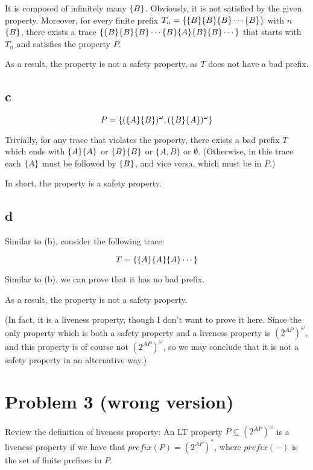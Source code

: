 It is composed of infinitely many $\{B\}$. Obviously, it is not satisfied by the given property.
Moreover, for every finite prefix $T_n = \{\{B\} \{B\} \{B\} \cdots \{B\}\}$ with $n$ $\{B\}$,
there exists a trace $\{\{B\} \{B\} \{B\} \cdots \{B\} \{A\} \{B\} \{B\} \cdots\}$
that starts with $T_n$ and satisfies the property $P$.

As a result, the property is not a safety property, as $T$ does not have a bad prefix.

\subsection{c}

$$
P = \{ (\{A\} \{B\})^\omega, (\{B\} \{A\})^\omega \}
$$

Trivially, for any trace that violates the property, there exists a bad prefix $T$
which ends with $\{A\} \{A\}$ or $\{B\} \{B\}$ or $\{A, B\}$ or $\emptyset$.
(Otherwise, in this trace each $\{A\}$ must be followed by $\{B\}$, and vice versa, which must be in $P$.)

In short, the property is a safety property.

\subsection{d}

Similar to (b), consider the following trace:

$$
T = \{\{A\} \{A\} \{A\} \cdots \}
$$

Similar to (b), we can prove that it has no bad prefix.

As a result, the property is not a safety property.

(In fact, it is a liveness property, though I don't want to prove it here.
Since the only property which is both a safety property and a liveness property is $(2^{AP})^\omega$,
and this property is of course not $(2^{AP})^\omega$, so we may conclude that it is not a safety property
in an alternative way.)

\section{Problem 3 (wrong version)}

\newcommand{\pref}{\textit{prefix}}

Review the definition of liveness property:
An LT property $P \subseteq (2^{AP})^\omega$ is a liveness property if we have that
$\pref(P) = (2^{AP})^*$, where $\pref(-)$ is the set of finite prefixes in $P$.

